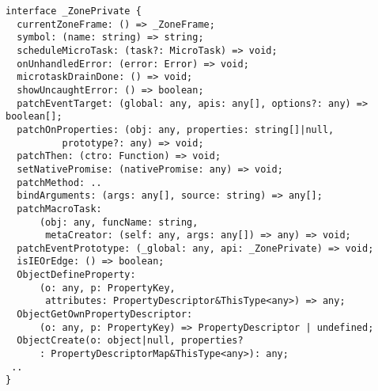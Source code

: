 \begin{verbatim}
interface _ZonePrivate {
  currentZoneFrame: () => _ZoneFrame;
  symbol: (name: string) => string;
  scheduleMicroTask: (task?: MicroTask) => void;
  onUnhandledError: (error: Error) => void;
  microtaskDrainDone: () => void;
  showUncaughtError: () => boolean;
  patchEventTarget: (global: any, apis: any[], options?: any) => boolean[];
  patchOnProperties: (obj: any, properties: string[]|null,
          prototype?: any) => void;
  patchThen: (ctro: Function) => void;
  setNativePromise: (nativePromise: any) => void;
  patchMethod: ..
  bindArguments: (args: any[], source: string) => any[];
  patchMacroTask:
      (obj: any, funcName: string,
       metaCreator: (self: any, args: any[]) => any) => void;
  patchEventPrototype: (_global: any, api: _ZonePrivate) => void;
  isIEOrEdge: () => boolean;
  ObjectDefineProperty:
      (o: any, p: PropertyKey,
       attributes: PropertyDescriptor&ThisType<any>) => any;
  ObjectGetOwnPropertyDescriptor:
      (o: any, p: PropertyKey) => PropertyDescriptor | undefined;
  ObjectCreate(o: object|null, properties?
      : PropertyDescriptorMap&ThisType<any>): any;
 ..
}
\end{verbatim}
